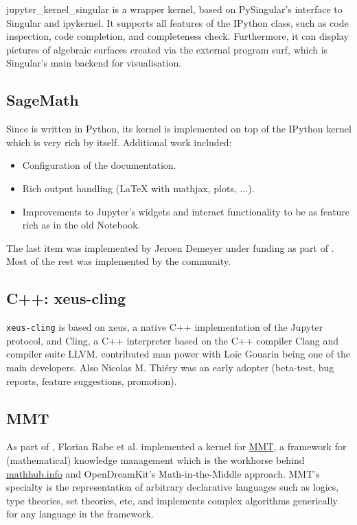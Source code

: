 \documentclass{deliverablereport}
\begin{document}
jupyter\_kernel\_singular is a wrapper kernel, based on PySingular's interface to Singular and ipykernel.
It supports all features of the IPython class, such as code inspection, code completion, and completeness check.
Furthermore, it can display pictures of algebraic surfaces
created via the external program surf, which is Singular's main backend for visualisation.

\subsection{SageMath}

Since \Sage is written in Python, its kernel is implemented
on top of the IPython kernel which is very rich by itself.
Additional work included:
\begin{itemize}
\item Configuration of the documentation.
\item Rich output handling (LaTeX with mathjax, plots, ...).
\item Improvements to Jupyter's widgets and interact functionality to be as feature rich as in the old \Sage Notebook.
\end{itemize}
The last item was implemented by Jeroen Demeyer under \ODK funding as part of .
Most of the rest was implemented by the \Sage community.

\subsection{C++: xeus-cling}

\texttt{xeus-cling} is based on xeus, a native C++ implementation of
the Jupyter protocol, and Cling, a C++ interpreter based on the C++
compiler Clang and compiler suite LLVM. \ODK contributed man power
with Loïc Gouarin being one of the main developers. Also Nicolas M.
Thiéry was an early adopter (beta-test, bug reports, feature
suggestions, promotion).

\subsection{MMT}

As part of , Florian Rabe et al.
implemented a kernel for
\href{https://www.kwarc.info/systems/mmt/}{MMT}, a framework for
(mathematical) knowledge management which is the workhorse behind
\url{mathhub.info} and OpenDreamKit's Math-in-the-Middle approach.
MMT's specialty is the representation of arbitrary declarative
languages such as logics, type theories, set theories, etc, and
implements complex algorithms generically for any language in the
framework.
\end{document}
